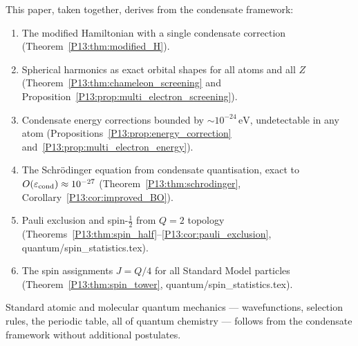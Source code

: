\begin{theorem}
\label{P13:thm:atomic_foundation}
This paper, taken together, derives from the condensate framework:
\begin{enumerate}[noitemsep]
\item The modified Hamiltonian with a single condensate correction
  (Theorem~\ref{P13:thm:modified_H}).
\item Spherical harmonics as exact orbital shapes for all atoms and all $Z$
  (Theorem~\ref{P13:thm:chameleon_screening} and
  Proposition~\ref{P13:prop:multi_electron_screening}).
\item Condensate energy corrections bounded by $\sim10^{-24}\,\mathrm{eV}$,
  undetectable in any atom (Propositions~\ref{P13:prop:energy_correction}
  and~\ref{P13:prop:multi_electron_energy}).
\item The Schr\"odinger equation from condensate quantisation,
  exact to $O(\varepsilon_{\rm cond})\approx10^{-27}$
  (Theorem~\ref{P13:thm:schrodinger}, Corollary~\ref{P13:cor:improved_BO}).
\item Pauli exclusion and spin-$\tfrac{1}{2}$ from $Q=2$ topology
  (Theorems~\ref{P13:thm:spin_half}--\ref{P13:cor:pauli_exclusion},
  quantum/spin\_statistics.tex).
\item The spin assignments $J=Q/4$ for all Standard Model particles
  (Theorem~\ref{P13:thm:spin_tower}, quantum/spin\_statistics.tex).
\end{enumerate}
Standard atomic and molecular quantum mechanics --- wavefunctions,
selection rules, the periodic table, all of quantum chemistry ---
follows from the condensate framework without additional postulates.
\end{theorem}

